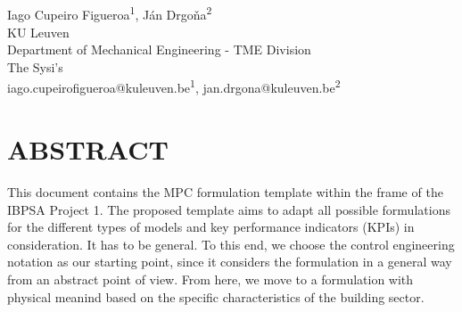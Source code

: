 \documentclass[10pt]{extarticle}
\begin{document}
	
\begin{center}
\vspace{0.2in}
\\[14pt]

{\fontsize{11pt}{1.2em}\selectfont
Iago Cupeiro Figueroa\textsuperscript{1}, J\'an Drgo\v na\textsuperscript{2}
\\[11pt]

KU Leuven\\
Department of Mechanical Engineering - TME Division\\
The Sysi's \\[11pt]

iago.cupeirofigueroa@kuleuven.be\textsuperscript{1}, jan.drgona@kuleuven.be\textsuperscript{2} \\
}
\end{center}

\vspace{0.5cm}


\section*{ABSTRACT}

This document contains the MPC formulation template within the frame of the IBPSA Project 1.
The proposed template aims to adapt all possible formulations for the different types of models and key performance indicators (KPIs) in consideration.
It has to be general.
To this end, we choose the control engineering notation as our starting point,
since it considers the formulation in a general way from an abstract point of view.
From here, we  move to a formulation with physical meanind based on the specific characteristics of the building sector.

%
%	
\end{document}
